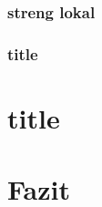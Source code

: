 \documentclass[a4paper,twoside]{IEEEtran}
\begin{document}
\subsubsection{streng lokal}
\subsubsection{title}

\section{title}


\section{Fazit}





\end{document}
